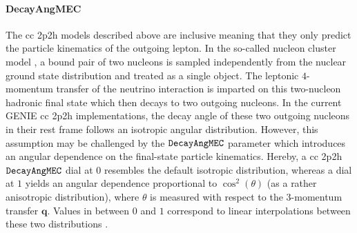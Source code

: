 \paragraph{DecayAngMEC}
The \acrshort{cc} \acrshort{2p2h} models described above are inclusive meaning that they only predict the particle kinematics of the outgoing lepton. In the so-called nucleon cluster model \cite{10.1063/1.4919465}, a bound pair of two nucleons is sampled independently from the nuclear ground state distribution and treated as a single object. The leptonic $4$-momentum transfer of the neutrino interaction is imparted on this two-nucleon hadronic final state which then decays to two outgoing nucleons. In the current GENIE \acrshort{cc} \acrshort{2p2h} implementations, the decay angle of these two outgoing nucleons in their rest frame follows an isotropic angular distribution. However, this assumption may be challenged by the $\verb!DecayAngMEC!$ parameter which introduces an angular dependence on the final-state particle kinematics. Hereby, a \acrshort{cc} \acrshort{2p2h} $\verb!DecayAngMEC!$ dial at $0$ resembles the default isotropic distribution, whereas a dial at $1$ yields an angular dependence proportional to $\cos^2(\theta)$ (as a rather anisotropic distribution), where $\theta$ is measured with respect to the $3$-momentum transfer $\mathbf{q}$. Values in between $0$ and $1$ correspond to linear interpolations between these two distributions \cite{PhysRevD.105.072001}.
